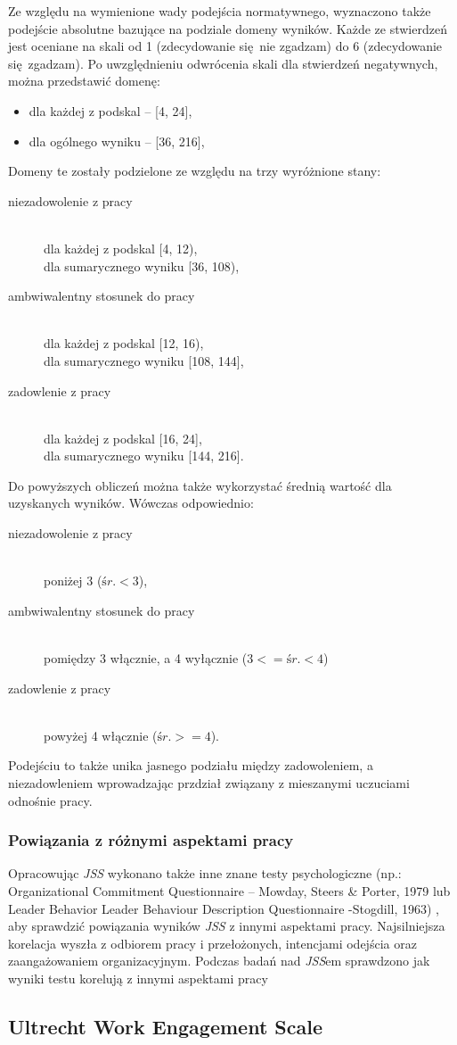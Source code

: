 Ze względu na wymienione wady podejścia normatywnego, wyznaczono także podejście absolutne bazujące na podziale domeny wyników. Każde ze stwierdzeń jest oceniane na skali od 1 (zdecydowanie się nie zgadzam) do 6 (zdecydowanie się zgadzam). Po uwzględnieniu odwrócenia skali dla stwierdzeń negatywnych, można przedstawić domenę:
\begin{itemize}
\item dla każdej z podskal -- [4, 24],
\item dla ogólnego wyniku -- [36, 216],
\end{itemize}
Domeny te zostały podzielone ze względu na trzy wyróżnione stany:
\begin{description}
\item[niezadowolenie z pracy] \hfill \\
dla każdej z podskal [4, 12), \hfill \\ dla sumarycznego wyniku [36, 108),
\item[ambwiwalentny stosunek do pracy] \hfill \\
dla każdej z podskal [12, 16), \hfill \\ dla sumarycznego wyniku [108, 144],
\item[zadowlenie z pracy] \hfill \\
dla każdej z podskal [16, 24], \hfill \\ dla sumarycznego wyniku [144, 216].
\end{description}

Do powyższych obliczeń można także wykorzystać średnią wartość dla uzyskanych wyników. Wówczas odpowiednio:
\begin{description}
\item[niezadowolenie z pracy] \hfill \\ poniżej 3 ($śr. <3$),
\item[ambwiwalentny stosunek do pracy] \hfill \\ pomiędzy 3 włącznie, a 4 wyłącznie ($ 3<= śr. < 4 $)
\item[zadowlenie z pracy] \hfill \\ powyżej 4 włącznie ($ śr. >= 4 $).
\end{description}

Podejściu to także unika jasnego podziału między zadowoleniem, a niezadowleniem wprowadzając przdział związany z mieszanymi uczuciami odnośnie pracy.

\subsubsection{Powiązania z różnymi aspektami pracy}
Opracowując \emph{JSS} wykonano także inne znane testy psychologiczne (np.: Organizational Commitment Questionnaire -- Mowday, Steers \& Porter, 1979 lub Leader Behavior Leader Behaviour Description Questionnaire -Stogdill, 1963) , aby sprawdzić powiązania wyników \emph{JSS} z innymi aspektami pracy. Najsilniejsza korelacja wyszła z odbiorem pracy i przełożonych, intencjami odejścia oraz zaangażowaniem organizacyjnym.
Podczas badań nad \emph{JSS}em sprawdzono jak wyniki testu korelują z innymi aspektami pracy
\subsection{Ultrecht Work Engagement Scale}

